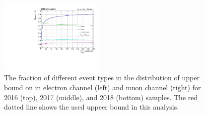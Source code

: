 \begin{figure}[p]
    \includegraphics[width=0.45\textwidth]{figure/bbSep_18_mu_Chi2_uppercut_bbSep.pdf}
    \caption[The fraction of different event types in the distribution of the upper bound on minimum \chisq.]
    {
        The fraction of different event types in the distribution of upper bound on \chisq in electron channel (left) and muon channel (right) for 2016 (top), 2017 (middle), and 2018 (bottom) samples.
        The red dotted line shows the used uppeer bound in this analysis.
    }
    \label{fig:bbsep_uppercut}
\end{figure}

